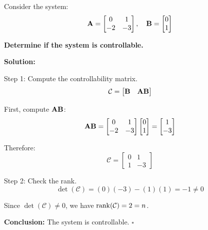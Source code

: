 \begin{examplebox}
\label{ex:second_order}
Consider the system:
\begin{equation}
\mathbf{A} = \begin{bmatrix} 0 & 1 \\ -2 & -3 \end{bmatrix}, \quad
\mathbf{B} = \begin{bmatrix} 0 \\ 1 \end{bmatrix}
\end{equation}

\textbf{Determine if the system is controllable.}

\textbf{Solution:}

Step 1: Compute the controllability matrix.
\begin{equation}
\mathcal{C} = \begin{bmatrix} \mathbf{B} & \mathbf{A}\mathbf{B} \end{bmatrix}
\end{equation}

First, compute $\mathbf{A}\mathbf{B}$:
\begin{equation}
\mathbf{A}\mathbf{B} = \begin{bmatrix} 0 & 1 \\ -2 & -3 \end{bmatrix} \begin{bmatrix} 0 \\ 1 \end{bmatrix} = \begin{bmatrix} 1 \\ -3 \end{bmatrix}
\end{equation}

Therefore:
\begin{equation}
\mathcal{C} = \begin{bmatrix} 0 & 1 \\ 1 & -3 \end{bmatrix}
\end{equation}

Step 2: Check the rank.
\begin{equation}
\det(\mathcal{C}) = (0)(-3) - (1)(1) = -1 \neq 0
\end{equation}

Since $\det(\mathcal{C}) \neq 0$, we have $\operatorname{rank}(\mathcal{C}) = 2 = n$.

\textbf{Conclusion:} The system is controllable. \hfill $\square$
\end{examplebox}

